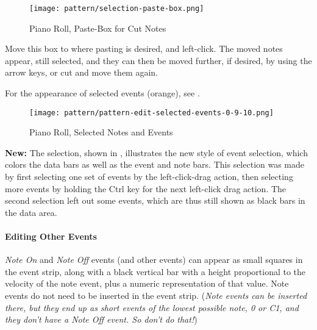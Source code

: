 \begin{figure}[H]
   \centering 
   \texttt{[image: pattern/selection-paste-box.png]}
   \caption{Piano Roll, Paste-Box for Cut Notes}
   \label{fig:pattern_editor_selection_paste_box}
\end{figure}
   
   Move this box to where pasting is
   desired, and left-click.  The moved notes appear, still selected,
   and they can then be moved further, if desired, by using the arrow keys, or
   cut and move them again.

   For the appearance of selected events (orange), see
   .

\begin{figure}[H]
   \centering 
   \texttt{[image: pattern/pattern-edit-selected-events-0-9-10.png]}
   \caption{Piano Roll, Selected Notes and Events}
   \label{fig:pattern_editor_selected_events}
\end{figure}

   \textbf{New:}
   The selection, shown in
   ,
   illustrates the new style of event selection, which colors the data
   bars as well as the event and note bars.  This selection was made by first
   selecting one set of events by the
   left-click-drag action, then
   selecting more events by holding the Ctrl key for the next left-click drag
   action.  The second selection left out some events, which are thus still
   shown as black bars in the data area.
   
\paragraph{Editing Other Events}
\label{paragraph:seq64_pattern_editor_other_events}


   \textsl{Note On} and \textsl{Note Off} events (and other events) can appear
   as small squares in the event strip, along with a black vertical bar with a
   height proportional to the velocity of the note event, plus a numeric
   representation of that value.
   Note events do not need to be inserted in the event strip.
   (\textsl{Note events can be inserted there, but they end up as short
   events of the lowest possible note, 0 or C1, and they don't have a Note
   Off event.  So don't do that!})


